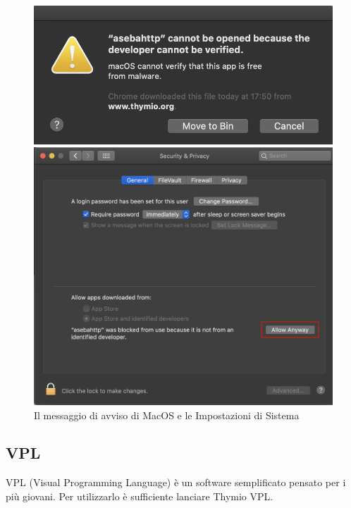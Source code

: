 \documentclass[12pt]{article}
\begin{document}
		\begin{figure}[H]
			\begin{minipage}{0.35\textwidth}
        				\centering
				\includegraphics[width=\textwidth]{img/macWarn1.png}
			\end{minipage}\hfill	
			\begin{minipage}{0.6\textwidth}
				\includegraphics[width=\textwidth]{img/macWarn2.png}
			\end{minipage}
			\caption{Il messaggio di avviso di MacOS e le Impostazioni di Sistema}
			\label{macErr}
		\end{figure}
		
	\subsection{VPL}
	
		VPL (Visual Programming Language) è un software semplificato pensato per i più giovani. Per utilizzarlo è sufficiente lanciare Thymio VPL.
		
\end{document}
